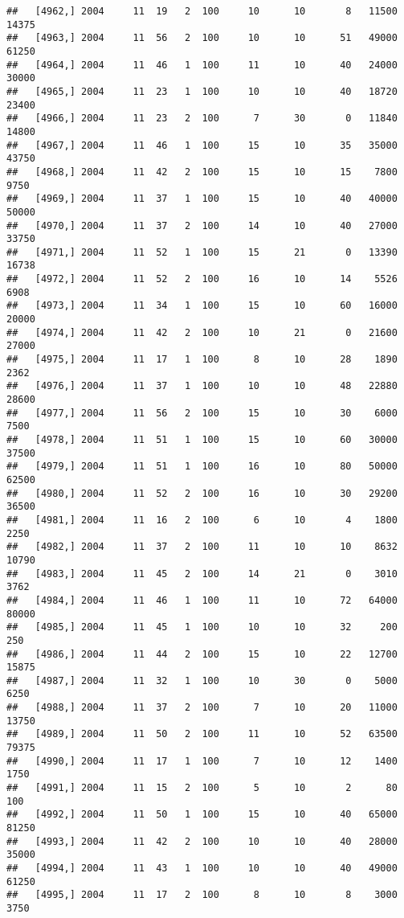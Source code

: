 \documentclass{article}\usepackage[]{graphicx}\usepackage[]{color}
\makeatletter
\newenvironment{kframe}{%
 \def\at@end@of@kframe{}%
 \ifinner\ifhmode%
  \def\at@end@of@kframe{\end{minipage}}%
  \begin{minipage}{\columnwidth}%
 \fi\fi%
 \def\FrameCommand##1{\hskip\@totalleftmargin \hskip-\fboxsep
 \colorbox{shadecolor}{##1}\hskip-\fboxsep
     \hskip-\linewidth \hskip-\@totalleftmargin \hskip\columnwidth}%
 \MakeFramed {\advance\hsize-\width
   \@totalleftmargin\z@ \linewidth\hsize
   \@setminipage}}%
 {\par\unskip\endMakeFramed%
 \at@end@of@kframe}
\newenvironment{knitrout}{}{} %
\makeatother
\begin{document}
\begin{knitrout}
\begin{kframe}
\begin{verbatim}
##   [4962,] 2004     11  19   2  100     10      10       8   11500   14375
##   [4963,] 2004     11  56   2  100     10      10      51   49000   61250
##   [4964,] 2004     11  46   1  100     11      10      40   24000   30000
##   [4965,] 2004     11  23   1  100     10      10      40   18720   23400
##   [4966,] 2004     11  23   2  100      7      30       0   11840   14800
##   [4967,] 2004     11  46   1  100     15      10      35   35000   43750
##   [4968,] 2004     11  42   2  100     15      10      15    7800    9750
##   [4969,] 2004     11  37   1  100     15      10      40   40000   50000
##   [4970,] 2004     11  37   2  100     14      10      40   27000   33750
##   [4971,] 2004     11  52   1  100     15      21       0   13390   16738
##   [4972,] 2004     11  52   2  100     16      10      14    5526    6908
##   [4973,] 2004     11  34   1  100     15      10      60   16000   20000
##   [4974,] 2004     11  42   2  100     10      21       0   21600   27000
##   [4975,] 2004     11  17   1  100      8      10      28    1890    2362
##   [4976,] 2004     11  37   1  100     10      10      48   22880   28600
##   [4977,] 2004     11  56   2  100     15      10      30    6000    7500
##   [4978,] 2004     11  51   1  100     15      10      60   30000   37500
##   [4979,] 2004     11  51   1  100     16      10      80   50000   62500
##   [4980,] 2004     11  52   2  100     16      10      30   29200   36500
##   [4981,] 2004     11  16   2  100      6      10       4    1800    2250
##   [4982,] 2004     11  37   2  100     11      10      10    8632   10790
##   [4983,] 2004     11  45   2  100     14      21       0    3010    3762
##   [4984,] 2004     11  46   1  100     11      10      72   64000   80000
##   [4985,] 2004     11  45   1  100     10      10      32     200     250
##   [4986,] 2004     11  44   2  100     15      10      22   12700   15875
##   [4987,] 2004     11  32   1  100     10      30       0    5000    6250
##   [4988,] 2004     11  37   2  100      7      10      20   11000   13750
##   [4989,] 2004     11  50   2  100     11      10      52   63500   79375
##   [4990,] 2004     11  17   1  100      7      10      12    1400    1750
##   [4991,] 2004     11  15   2  100      5      10       2      80     100
##   [4992,] 2004     11  50   1  100     15      10      40   65000   81250
##   [4993,] 2004     11  42   2  100     10      10      40   28000   35000
##   [4994,] 2004     11  43   1  100     10      10      40   49000   61250
##   [4995,] 2004     11  17   2  100      8      10       8    3000    3750

\end{verbatim}
\end{kframe}
\end{knitrout}
\end{document}
